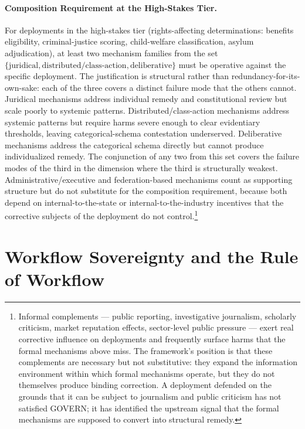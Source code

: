\documentclass{article}
\theoremstyle{definition}
\begin{document}
\paragraph{Composition Requirement at the High-Stakes Tier.} For deployments in the high-stakes tier (rights-affecting determinations: benefits eligibility, criminal-justice scoring, child-welfare classification, asylum adjudication), at least two mechanism families from the set $\{\text{juridical}, \text{distributed/class-action}, \text{deliberative}\}$ must be operative against the specific deployment. The justification is structural rather than redundancy-for-its-own-sake: each of the three covers a distinct failure mode that the others cannot. Juridical mechanisms address individual remedy and constitutional review but scale poorly to systemic patterns. Distributed/class-action mechanisms address systemic patterns but require harms severe enough to clear evidentiary thresholds, leaving categorical-schema contestation underserved. Deliberative mechanisms address the categorical schema directly but cannot produce individualized remedy. The conjunction of any two from this set covers the failure modes of the third in the dimension where the third is structurally weakest. Administrative/executive and federation-based mechanisms count as supporting structure but do not substitute for the composition requirement, because both depend on internal-to-the-state or internal-to-the-industry incentives that the corrective subjects of the deployment do not control.\footnote{Informal complements --- public reporting, investigative journalism, scholarly criticism, market reputation effects, sector-level public pressure --- exert real corrective influence on deployments and frequently surface harms that the formal mechanisms above miss. The framework's position is that these complements are necessary but not substitutive: they expand the information environment within which formal mechanisms operate, but they do not themselves produce binding correction. A deployment defended on the grounds that it can be subject to journalism and public criticism has not satisfied GOVERN; it has identified the upstream signal that the formal mechanisms are supposed to convert into structural remedy.}


\section{Workflow Sovereignty and the Rule of Workflow}
\label{sec:workflow}
\end{document}
